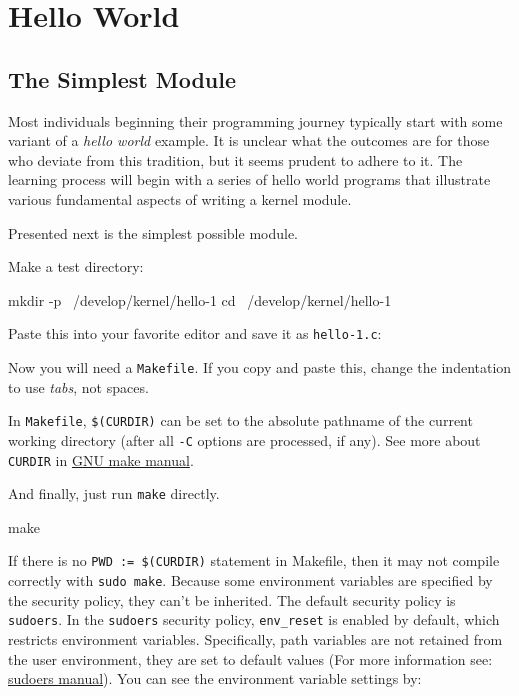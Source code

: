 \documentclass[10pt, oneside]{book}
\begin{document}
\section{Hello World}
\label{sec:helloworld}
\subsection{The Simplest Module}
\label{sec:org2d3e245}
Most individuals beginning their programming journey typically start with some variant of a \emph{hello world} example.
It is unclear what the outcomes are for those who deviate from this tradition, but it seems prudent to adhere to it.
The learning process will begin with a series of hello world programs that illustrate various fundamental aspects of writing a kernel module.

Presented next is the simplest possible module.

Make a test directory:
\begin{codebash}
mkdir -p ~/develop/kernel/hello-1
cd ~/develop/kernel/hello-1
\end{codebash}

Paste this into your favorite editor and save it as \verb|hello-1.c|:


Now you will need a \verb|Makefile|. If you copy and paste this, change the indentation to use \textit{tabs}, not spaces.


In \verb|Makefile|, \verb|$(CURDIR)| can be set to the absolute pathname of the current working directory (after all \verb|-C| options are processed, if any). 
See more about \verb|CURDIR| in \href{https://www.gnu.org/software/make/manual/make.html}{GNU make manual}.

And finally, just run \verb|make| directly.

\begin{codebash}
make
\end{codebash}

If there is no \verb|PWD := $(CURDIR)| statement in Makefile, then it may not compile correctly with \verb|sudo make|.
Because some environment variables are specified by the security policy, they can't be inherited.
The default security policy is \verb|sudoers|.
In the \verb|sudoers| security policy, \verb|env_reset| is enabled by default, which restricts environment variables. 
Specifically, path variables are not retained from the user environment, they are set to default values (For more information see: \href{https://www.sudo.ws/docs/man/sudoers.man/}{sudoers manual}).
You can see the environment variable settings by:
\end{document}
